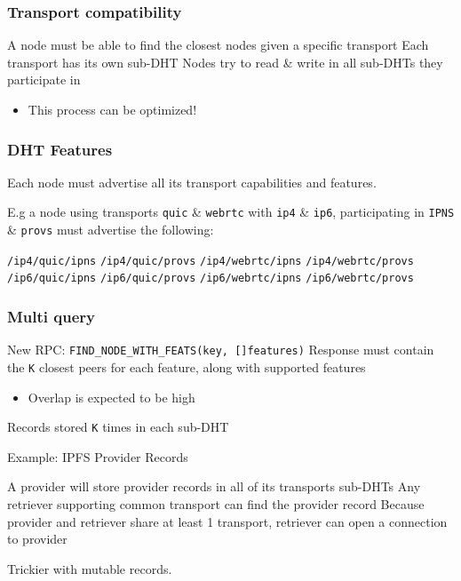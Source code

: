 \documentclass{../shipyard-slide}
\begin{document}
\begin{frame}
\frametitle{Transport compatibility}

\begin{itemize}
	\itemc A node must be able to find the closest nodes given a specific transport
	\itemc Each transport has its own sub-DHT
	\itemc Nodes try to read \& write in all sub-DHTs they participate in
	\begin{itemize}
		\item[\greencube] This process can be optimized!
	\end{itemize}
\end{itemize}
\end{frame}

\begin{frame}
\frametitle{DHT Features}

Each node must advertise all its transport capabilities and features.

\medskip

E.g a node using transports \texttt{quic} \& \texttt{webrtc} with \texttt{ip4} \& \texttt{ip6}, participating in \texttt{IPNS} \& \texttt{provs} must advertise the following:
\medskip
\begin{itemize}
	\itemc \texttt{/ip4/quic/ipns}
	\itemc \texttt{/ip4/quic/provs}
	\itemc \texttt{/ip4/webrtc/ipns}
	\itemc \texttt{/ip4/webrtc/provs}
	\itemc \texttt{/ip6/quic/ipns}
	\itemc \texttt{/ip6/quic/provs}
	\itemc \texttt{/ip6/webrtc/ipns}
	\itemc \texttt{/ip6/webrtc/provs}
\end{itemize}
\end{frame}


\begin{frame}
\frametitle{Multi query}

\begin{itemize}
	\itemc New RPC: \texttt{FIND\_NODE\_WITH\_FEATS(key, []features)}
	\itemc Response must contain the \texttt{K} closest peers for each feature, along with supported features
	\begin{itemize}
		\item[\greencube] Overlap is expected to be high
	\end{itemize}
	\itemc Records stored \texttt{K} times in each sub-DHT
\end{itemize}
\medskip

Example: IPFS Provider Records
\begin{itemize}
	\itemc A provider will store provider records in all of its transports sub-DHTs
	\itemc Any retriever supporting common transport can find the provider record
	\itemc Because provider and retriever share at least 1 transport, retriever can open a connection to provider
\end{itemize}
\medskip
Trickier with mutable records.
\end{frame}
\end{document}
